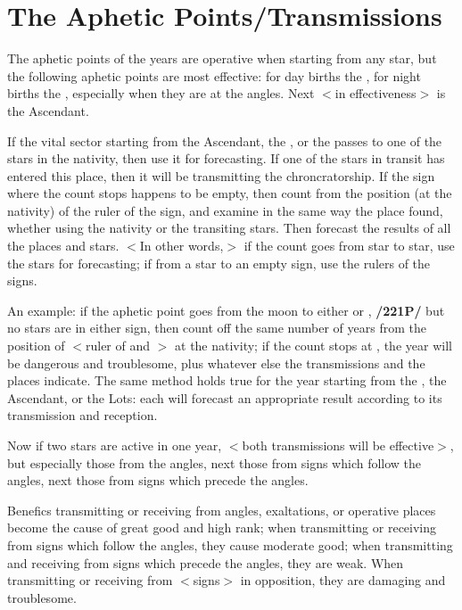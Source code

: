 \section{The Aphetic Points/Transmissions}

The aphetic points of the years are operative when starting from any star, but the following aphetic points are most effective: for day births the \Sun, for night births the \Moon, especially when they are at the
angles. Next $<$in effectiveness$>$ is the Ascendant. 

If the vital sector starting from the Ascendant, the \Moon, or the \Sun\xspace passes to one of the stars in the nativity, then use it for forecasting. If one of the stars in transit has entered this place, then it will be transmitting the chroncratorship. If the sign where the count stops happens to be empty, then count from the position (at the nativity) of the ruler of the sign, and examine in the same way the place found, whether using the nativity or the transiting stars. Then forecast the results of all the places and stars. $<$In other words,$>$ if the count goes from star to star, use the stars for forecasting; if
from a star to an empty sign, use the rulers of the signs.

An example: if the aphetic point goes from the moon to either \Aries\xspace or \Scorpio, \textbf{/221P/} but no stars are
in either sign, then count off the same number of years from the position of \Mars\xspace $<$ruler of \Aries\xspace and \Scorpio$>$ at the nativity; if the count stops at \Saturn, the year will be dangerous and troublesome, plus whatever else the transmissions and the places indicate. The same method holds true for the year starting from the \Sun, the Ascendant, or the Lots: each will forecast an appropriate result according to its transmission and reception.

Now if two stars are active in one year, $<$both transmissions will be effective$>$, but especially those from the angles, next those from signs which follow the angles, next those from signs which precede the angles. 

Benefics transmitting or receiving from angles, exaltations, or operative places become the cause of great good and high rank; when transmitting or receiving from signs which follow the angles, they cause moderate good; when transmitting and receiving from signs which precede the angles, they are weak. When transmitting or receiving from $<$signs$>$ in opposition, they are damaging and troublesome. 

